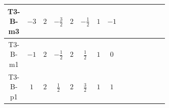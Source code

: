 \documentclass[8pt]{article}
\begin{document}
\begin{landscape}
\begin{longtable}{@{}cccccccc >{\raggedright\arraybackslash}p{0.21\linewidth} >{\raggedright\arraybackslash}p{0.21\linewidth} >{\raggedright\arraybackslash}p{0.21\linewidth}@{}}
\midrule
T3-B-m3 & $-3$ & $2$ & $-\frac{3}{2}$ & $2$ & $-\frac{1}{2}$ & $1$ & $-1$ & \scriptsize\adjustbox{max width=\linewidth}{$\begin{gathered} +D_{\mu _1}\left(S_{2,j_1}\right){}^{\dagger } D_{\mu _1}\left(S_{2,j_1}\right)\end{gathered}$} & \scriptsize\adjustbox{max width=\linewidth}{$\begin{gathered} -\overline{F_{r_1}}\, F_{r_1} M_F\end{gathered}$} & \scriptsize\adjustbox{max width=\linewidth}{$\begin{gathered} +i \overline{F_{r_1}}\, \gamma ^{\mu _1}\, D_{\mu _1}\left(F_{r_1}\right)\end{gathered}$} \\
\midrule
T3-B-m1 & $-1$ & $2$ & $-\frac{1}{2}$ & $2$ & $\frac{1}{2}$ & $1$ & $0$ & \scriptsize\adjustbox{max width=\linewidth}{$\begin{gathered} +D_{\mu _1}\left(S_{2,j_1}\right){}^{\dagger } D_{\mu _1}\left(S_{2,j_1}\right)\end{gathered}$} & \scriptsize\adjustbox{max width=\linewidth}{$\begin{gathered} -\frac{1}{2} F_{r_1}{}^T\, C\, F_{r_1} M_F\end{gathered}$} & \scriptsize\adjustbox{max width=\linewidth}{$\begin{gathered} +\frac{1}{2} i F_{r_1}{}^T\, C\, \gamma ^{\mu _1}\, D_{\mu _1}\left(F_{r_1}\right)\end{gathered}$} \\
\midrule
T3-B-p1 & $1$ & $2$ & $\frac{1}{2}$ & $2$ & $\frac{3}{2}$ & $1$ & $1$ & \scriptsize\adjustbox{max width=\linewidth}{$\begin{gathered} +D_{\mu _1}\left(S_{2,j_1}\right){}^{\dagger } D_{\mu _1}\left(S_{2,j_1}\right)\end{gathered}$} & \scriptsize\adjustbox{max width=\linewidth}{$\begin{gathered} -\overline{F_{r_1}}\, F_{r_1} M_F\end{gathered}$} & \scriptsize\adjustbox{max width=\linewidth}{$\begin{gathered} +i \overline{F_{r_1}}\, \gamma ^{\mu _1}\, D_{\mu _1}\left(F_{r_1}\right)\end{gathered}$} \\
\midrule

\end{longtable}
\end{landscape}
\end{document}
